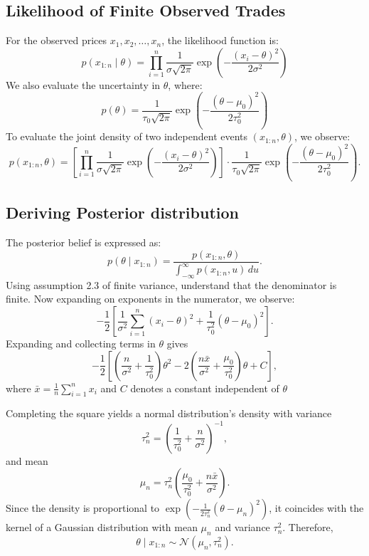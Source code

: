 \documentclass[12pt]{article}
\theoremstyle{plain}
\theoremstyle{definition}
\numberwithin{equation}{section}
\begin{document}
\subsection{Likelihood of Finite Observed Trades}
For the observed prices $x_1,x_2,\dots,x_n$, the likelihood function is:
\begin{equation}
p(x_{1:n}\mid \theta) =  \prod^n_{i=1} \frac{1}{\sigma \sqrt{2\pi}} \exp {\left(-\frac{(x_i - \theta)^2}{2\sigma^2} \right)}
\end{equation}
We also evaluate the uncertainty in $\theta$, where:
\begin{equation}
p(\theta) = \frac{1}{\tau_0\sqrt{2\pi}} \exp{\left(-\frac{(\theta-\mu_0)^2}{2\tau_0^2}\right)}
\end{equation}
To evaluate the joint density of two independent events $(x_{1:n},\theta)$, we observe:
\begin{equation}
p(x_{1:n},\theta)
= \left[ \prod_{i=1}^n \frac{1}{\sigma\sqrt{2\pi}} \exp\left(-\frac{(x_i-\theta)^2}{2\sigma^2}\right) \right]
\cdot
\frac{1}{\tau_0\sqrt{2\pi}} \exp\!\left(-\frac{(\theta-\mu_0)^2}{2\tau_0^2}\right).
\end{equation}

\subsection{Deriving Posterior distribution}
The posterior belief is expressed as: 
\begin{equation}
p(\theta \mid x_{1:n})
=
\frac{p(x_{1:n},\theta)}
{\int_{-\infty}^{\infty} p(x_{1:n},u)\,du}.
\end{equation}
Using assumption 2.3 of finite variance, understand that the denominator is finite.
Now expanding on exponents in the  numerator, we observe:
\begin{equation}
-\frac{1}{2}
\left[
\frac{1}{\sigma^2}\sum_{i=1}^n (x_i-\theta)^2
+
\frac{1}{\tau_0^2}(\theta-\mu_0)^2
\right].
\end{equation}
Expanding and collecting terms in $\theta$ gives
\begin{equation}
-\frac{1}{2}
\left[
\left(\frac{n}{\sigma^2}+\frac{1}{\tau_0^2}\right)\theta^2
-
2\left(
\frac{n\bar{x}}{\sigma^2}
+
\frac{\mu_0}{\tau_0^2}
\right)\theta
+
C
\right],
\end{equation}
where $\bar{x} = \frac{1}{n}\sum_{i=1}^n x_i$ and $C$ denotes a constant independent of $\theta$

Completing the square yields a normal distribution's density with variance
\begin{equation}
\tau_n^2 =
\left(
\frac{1}{\tau_0^2}+\frac{n}{\sigma^2}
\right)^{-1},
\end{equation}
and mean
\begin{equation}
\mu_n =
\tau_n^2
\left(
\frac{\mu_0}{\tau_0^2}
+
\frac{n\bar{x}}{\sigma^2}
\right).
\end{equation}
Since the density is proportional to $\exp\!\left(-\frac{1}{2\tau_n^2}(\theta-\mu_n)^2\right)$, it coincides with the kernel of a Gaussian distribution with mean $\mu_n$ and variance $\tau_n^2$. Therefore,
\begin{equation}
\theta \mid x_{1:n} \sim \mathcal{N}(\mu_n,\tau_n^2).
\end{equation}
\end{document}

